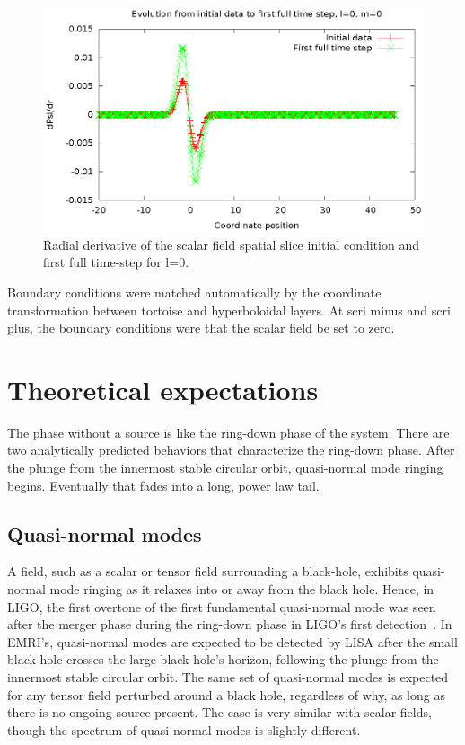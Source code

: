 \begin{figure}
  \includegraphics{phi1dl0}
  \caption{Radial derivative of the scalar field spatial slice initial condition and first full time-step for l=0.}
  \label{phi0}
\end{figure}

Boundary conditions were matched automatically by the coordinate transformation between tortoise and hyperboloidal layers. At scri minus and scri plus, the boundary conditions were that the scalar field be set to zero. 

\section{Theoretical expectations}

The phase without a source is like the ring-down phase of the system. There are two analytically predicted behaviors that characterize the ring-down phase. After the plunge from the innermost stable circular orbit, quasi-normal mode ringing begins. Eventually that fades into a long, power law tail.

\subsection{Quasi-normal modes}
A field, such as a scalar or tensor field surrounding a black-hole, exhibits quasi-normal mode ringing as it relaxes into or away from the black hole.  Hence, in LIGO, the first overtone of the first fundamental quasi-normal mode was seen after the merger phase during the ring-down phase in LIGO's first detection~\cite{LIGO1e}. In EMRI's, quasi-normal modes are expected to be detected by LISA after the small black hole crosses the large black hole's horizon, following the plunge from the innermost stable circular orbit. The same set of quasi-normal modes is expected for any tensor field perturbed around a black hole, regardless of why, as long as there is no ongoing source present. The case is very similar with scalar fields, though the spectrum of quasi-normal modes is slightly different.

